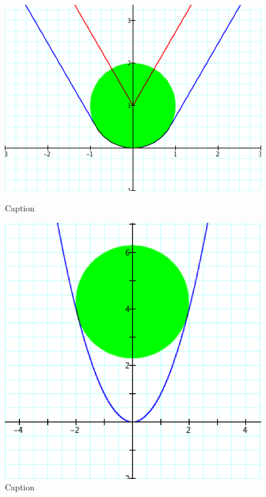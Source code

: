 \begin{figure}[h!]
  \centering    
  \label{}
  \begin{minipage}[b]{0.23\linewidth}
      \centering
      \includegraphics[width=.9\linewidth]{findig-crunch-spots-img/Fig 25.png}
      \caption{Caption}
      \label{fig:fig25}
  \end{minipage}
  \begin{minipage}[b]{0.23\linewidth}
      \centering
      \includegraphics[width=.9\linewidth]{findig-crunch-spots-img/Fig 26.png}
      \caption{Caption}
      \label{fig:fig26}
  \end{minipage}
  \begin{minipage}[b]{0.23\linewidth}

\end{minipage}
\end{figure}
